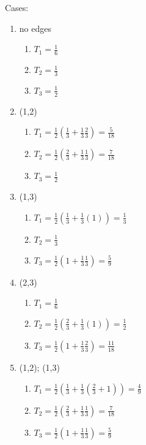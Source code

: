 \documentclass[11pt]{article}
\theoremstyle{quest}
\begin{document}
\begin{enumerate}
    Cases:
    \begin{enumerate}
        \item no edges
        \begin{enumerate}
            \item $T_1 = \frac{1}{6}$
            \item $T_2 = \frac{1}{3}$
            \item $T_3 = \frac{1}{2}$
        \end{enumerate}
        \item (1,2)
        \begin{enumerate}
            \item $T_1 = \frac{1}{2}(\frac{1}{3}+\frac{1}{3}\frac{2}{3}) = \frac{5}{18}$
            \item $T_2 = \frac{1}{2}(\frac{2}{3}+\frac{1}{3}\frac{1}{3}) = \frac{7}{18}$
            \item $T_3 = \frac{1}{2}$
        \end{enumerate}
        \item (1,3)
        \begin{enumerate}
            \item $T_1 = \frac{1}{2}(\frac{1}{3}+\frac{1}{3}(1)) = \frac{1}{3}$
            \item $T_2 = \frac{1}{3}$
            \item $T_3 = \frac{1}{2}(1+\frac{1}{3}\frac{1}{3}) = \frac{5}{9}$
        \end{enumerate}
        \item (2,3)
        \begin{enumerate}
            \item $T_1 = \frac{1}{6}$
            \item $T_2 = \frac{1}{2}(\frac{2}{3}+\frac{1}{3}(1)) = \frac{1}{2}$
            \item $T_3 = \frac{1}{2}(1+\frac{1}{3}\frac{2}{3}) = \frac{11}{18}$
        \end{enumerate}
        \item (1,2); (1,3)
        \begin{enumerate}
            \item $T_1 = \frac{1}{2}(\frac{1}{3}+\frac{1}{3}(\frac{2}{3}+1)) = \frac{4}{9}$
            \item $T_2 = \frac{1}{2}(\frac{2}{3}+\frac{1}{3}\frac{1}{3}) = \frac{7}{18}$
            \item $T_3 = \frac{1}{2}(1+\frac{1}{3}\frac{1}{3}) = \frac{5}{9}$
        \end{enumerate}

\end{enumerate}
\end{enumerate}
\end{document}

